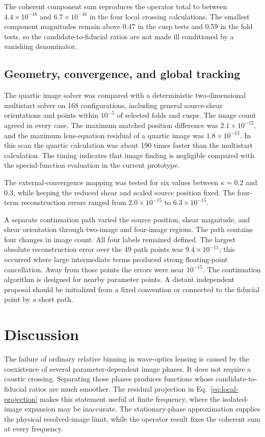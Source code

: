 \documentclass[aps,prd,twocolumn,nofootinbib,superscriptaddress,floatfix]{revtex4-2}
\begin{document}
The coherent component sum reproduces the operator total to between
$4.4\times10^{-16}$ and $6.7\times10^{-16}$ in the four local crossing
calculations.  The smallest component magnitudes remain above 0.47 in the cusp
tests and 0.59 in the fold tests, so the candidate-to-fiducial ratios are not
made ill conditioned by a vanishing denominator.

\subsection{Geometry, convergence, and global tracking}

The quartic image solver was compared with a deterministic two-dimensional
multistart solver on 168 configurations, including general source-shear
orientations and points within $10^{-5}$ of selected folds and cusps.  The
image count agreed in every case.  The maximum matched position difference was
$2.1\times10^{-12}$, and the maximum lens-equation residual of a quartic image
was $1.8\times10^{-13}$.  In this scan the quartic calculation was about 190
times faster than the multistart calculation.  The timing indicates that image
finding is negligible compared with the special-function evaluation in the
current prototype.

The external-convergence mapping was tested for six values between
$\kappa=0.2$ and $0.3$, while keeping the reduced shear and scaled source
position fixed.  The four-term reconstruction errors ranged from
$2.0\times10^{-15}$ to $6.3\times10^{-15}$.

A separate continuation path varied the source position, shear magnitude, and
shear orientation through two-image and four-image regions.  The path contains
four changes in image count.  All four labels remained defined.  The largest
absolute reconstruction error over the 49 path points was
$9.4\times10^{-11}$; this occurred where large intermediate terms produced
strong floating-point cancellation.  Away from those points the errors were
near $10^{-15}$.  The continuation algorithm is designed for nearby parameter
points.  A distant independent proposal should be initialized from a fixed
convention or connected to the fiducial point by a short path.

\FloatBarrier
\section{Discussion}
\label{sec:discussion}

The failure of ordinary relative binning in wave-optics lensing is caused by
the coexistence of several parameter-dependent image phases.  It does not
require a caustic crossing.  Separating those phases produces functions whose
candidate-to-fiducial ratios are much smoother.  The residual projection in
Eq.~\eqref{eq:local-projection} makes this statement useful at finite
frequency, where the isolated-image expansion may be inaccurate.  The
stationary-phase approximation supplies the physical resolved-image limit,
while the operator result fixes the coherent sum at every frequency.
\end{document}
